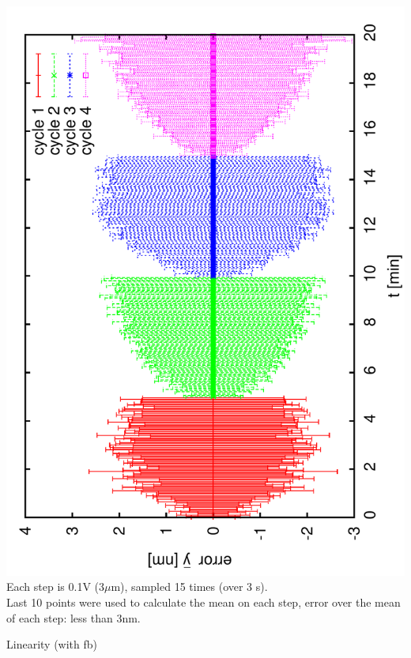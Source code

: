 \documentclass[a4paper,11pt]{book}
\begin{document}
 \includegraphics[angle=-90,scale=0.16]{image05c.pdf}\\
 {\tiny Each step is 0.1V (3$\mu$m), sampled 15 times (over 3 s).}\\ 
{\tiny Last 10 points were used to calculate the mean on each step, error over the mean of each step: less than 3nm.}\par
Linearity (with fb)\par
\end{document}
